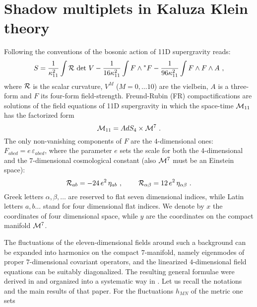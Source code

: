 \documentclass[a4paper,11pt]{article}
\begin{document}
\section{Shadow multiplets in Kaluza Klein
theory}\label{secshadow}
Following the conventions of \cite{ricpie11} the bosonic action of
11D supergravity reads:
\begin{equation}
\label{boslag11} S = {1\over \kappa_{11}^2} \int {\cal R}\, \det\,
V  - {1\over 16 \kappa_{11}^2} \int F \wedge {}^* F - {1\over 96
\kappa_{11}^2} \int F\wedge F\wedge A~,
\end{equation}
where ${\cal R}$ is the scalar curvature, $V^{M}$ ($M=0,\ldots
10$) are the vielbein, $A$ is a three-form and $F$ its four-form
field-strength. Freund-Rubin (FR) compactifications
\cite{FreundRubin} are solutions of the field equations of 11D
supergravity in which the space-time ${\cal M}_{11}$ has the
factorized form
\begin{equation}
\label{11=4+7} {\cal M}_{11}=AdS_4\times {\cal M}^7~.
\end{equation}
The only non-vanishing components of $F$ are the $4$-dimensional
ones: $F_{abcd}=e\, \varepsilon_{abcd}$, where the parameter $e$
sets the scale for both the 4-dimensional and the $7$-dimensional
cosmological constant (also ${\cal M}^7$ must be an Einstein
space):
\begin{equation}
\label{cosmol4e7} {\cal R}_{ab} = -24\, e^2\, \eta_{ab}~,\hskip
0.8cm {\cal R}_{\alpha\beta} = 12\, e^2\, \eta_{\alpha\beta}~.
\end{equation}
Greek letters $\alpha,\beta,\ldots$ are reserved to flat seven
dimensional indices, while Latin letters $a,b\ldots$ stand for
four dimensional flat indices. We denote by $x$ the coordinates of
four dimensional space, while $y$ are the coordinates on the
compact manifold ${\cal M}^7$.
\par
The fluctuations of the eleven-dimensional fields around such a
background can be expanded into harmonics on the compact
$7$-manifold, namely eigenmodes of proper $7$-dimensional
covariant operators, and the linearized $4$-dimensional field
equations can be suitably diagonalized. The resulting general
formulae were derived in \cite{spectfer,bosmass} and organized
into a systematic way in \cite{univer}. Let us recall the
notations and the main results of that paper. For the fluctuations
$h_{MN}$ of the metric one sets
\end{document}
